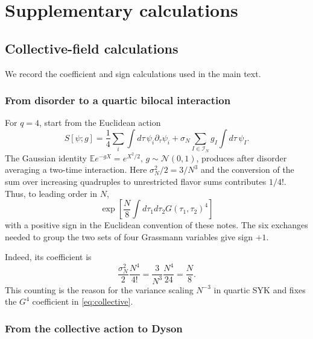 \documentclass[11pt]{article}
\numberwithin{equation}{section}
\theoremstyle{exposition}
\theoremstyle{result}
\newcommand{\E}{\mathbb E}
\begin{document}
\section{Supplementary calculations}\label{app:identities}

\subsection{Collective-field calculations}

We record the coefficient and sign calculations used in the main text.

\subsubsection{From disorder to a quartic bilocal interaction}

For $q=4$, start from the Euclidean action
\begin{equation*}
S[\psi;g]
=\frac14\sum_i\int d\tau\,\psi_i\partial_\tau\psi_i
+\sigma_N\sum_{I\in\mathcal I_N}g_I\int d\tau\,\psi_I.
\end{equation*}
The Gaussian identity $\E e^{-gX}=e^{X^2/2}, \, g\sim\mathcal N(0,1)$, produces after disorder averaging a two-time interaction. Here $\sigma_N^2/2=3/N^3$ and the conversion of the sum over increasing quadruples to unrestricted flavor sums contributes $1/4!$. Thus, to leading order in $N$,
\begin{equation*}
\exp\left[
\frac N8\int d\tau_1d\tau_2
G(\tau_1,\tau_2)^4
\right]
\end{equation*}
with a positive sign in the Euclidean convention of these notes. The six exchanges needed to group the two sets of four Grassmann variables give sign $+1$.

Indeed, its coefficient is
\begin{equation*}
\frac{\sigma_N^2}{2}\frac{N^4}{4!}
=\frac{3}{N^3}\frac{N^4}{24}
=\frac N8.
\end{equation*}
This counting is the reason for the variance scaling $N^{-3}$ in quartic SYK and fixes the $G^4$ coefficient in \eqref{eq:collective}.

\subsubsection{From the collective action to Dyson}
\end{document}
